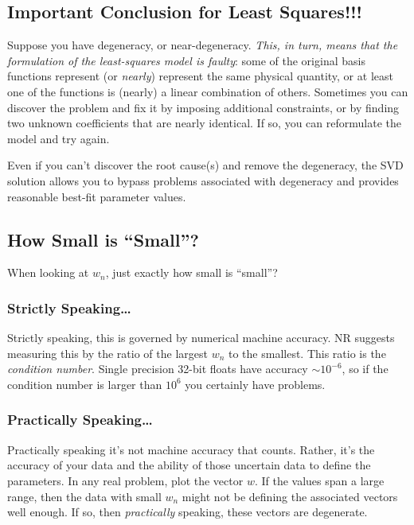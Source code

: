 \documentclass[psfig,preprint]{aastex}
\begin{document}
\subsection{Important Conclusion for Least Squares!!!} \label{svdimport}

	Suppose you have degeneracy, or near-degeneracy. {\it This, in
turn, means that the formulation of the least-squares model is faulty}:
some of the original basis functions represent (or {\it nearly})
represent the same physical quantity, or at least one of the functions
is (nearly) a linear combination of others.  Sometimes you can discover
the problem and fix it by imposing additional constraints, or by finding
two unknown coefficients that are nearly identical.  If so, you can
reformulate the model and try again.

Even if you can't discover the root cause(s) and remove the degeneracy,
the SVD solution allows you to bypass problems associated with
degeneracy and provides reasonable best-fit parameter values.

\subsection{How Small is ``Small''?}

	When looking at $w_n$, just exactly how small is ``small''? 

\subsubsection{Strictly Speaking\dots}

	Strictly speaking, this is governed by numerical machine
accuracy. NR suggests measuring this by the ratio of the largest $w_n$
to the smallest. This ratio is the {\it condition number}. Single
precision 32-bit floats have accuracy $\sim 10^{-6}$, so if the
condition number is larger than $10^6$ you certainly have problems.

\subsubsection{Practically Speaking\dots}

	Practically speaking it's not machine accuracy that counts.
Rather, it's the accuracy of your data and the ability of those
uncertain data to define the parameters. In any real problem, plot the
vector $w$. If the values span a large range, then the data with small
$w_n$ might not be  defining the associated vectors well enough. If so, 
then {\it practically} speaking, these vectors are degenerate. 
\end{document}
